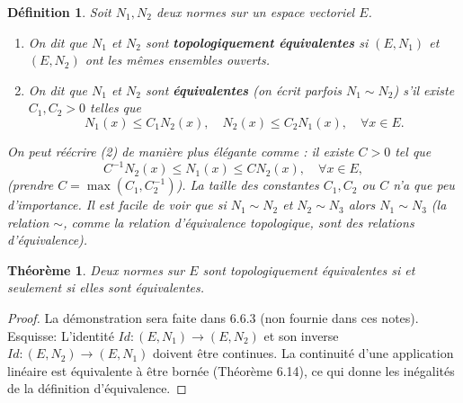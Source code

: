 \documentclass{article}
\newtheorem{theorem}{Théorème}
\newtheorem{definition}{Définition}
\begin{document}
\begin{definition}
Soit $N_1, N_2$ deux normes sur un espace vectoriel $E$.
\begin{enumerate}
    \item On dit que $N_1$ et $N_2$ sont \textbf{topologiquement équivalentes} si $(E, N_1)$ et $(E, N_2)$ ont les mêmes ensembles ouverts.
    \item On dit que $N_1$ et $N_2$ sont \textbf{équivalentes} (on écrit parfois $N_1 \sim N_2$) s'il existe $C_1, C_2 > 0$ telles que
    \[ N_1(x) \leq C_1 N_2(x), \quad N_2(x) \leq C_2 N_1(x), \quad \forall x \in E. \]
\end{enumerate}
On peut réécrire (2) de manière plus élégante comme : il existe $C > 0$ tel que
\[ C^{-1} N_2(x) \leq N_1(x) \leq C N_2(x), \quad \forall x \in E, \]
(prendre $C = \max(C_1, C_2^{-1})$). La taille des constantes $C_1, C_2$ ou $C$ n'a que peu d'importance.
Il est facile de voir que si $N_1 \sim N_2$ et $N_2 \sim N_3$ alors $N_1 \sim N_3$ (la relation $\sim$, comme la relation d'équivalence topologique, sont des relations d'équivalence).
\end{definition}

\begin{theorem}
Deux normes sur $E$ sont topologiquement équivalentes si et seulement si elles sont équivalentes.
\end{theorem}
\begin{proof}
La démonstration sera faite dans 6.6.3 (non fournie dans ces notes). Esquisse: L'identité $Id: (E, N_1) \to (E, N_2)$ et son inverse $Id: (E, N_2) \to (E, N_1)$ doivent être continues. La continuité d'une application linéaire est équivalente à être bornée (Théorème 6.14), ce qui donne les inégalités de la définition d'équivalence.
\end{proof}
\end{document}
